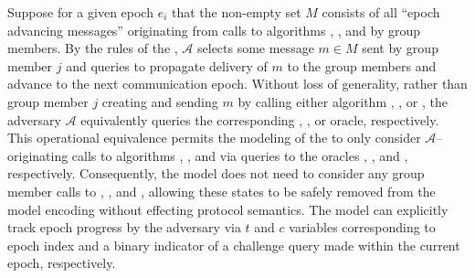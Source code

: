 \documentclass[runningheads]{llncs}
\newcommand{\Adversary}{\ensuremath{\mathcal{A}}\xspace}
\begin{document}
Suppose for a given epoch $e_i$ that the non-empty set $M$ consists of all ``epoch advancing messages'' originating from calls to algorithms , , and  by group members.
By the rules of the \CGKAsec, \Adversary selects some message $m \in M$ sent by group member $j$ and queries  to propagate delivery of $m$ to the group members and advance to the next communication epoch.
Without loss of generality, rather than group member $j$ creating and sending $m$ by calling either algorithm , , or , the adversary \Adversary equivalently queries the corresponding , , or  oracle, respectively.
This operational equivalence permits the modeling of the \CGKAsec to only consider \Adversary--originating calls to algorithms , , and  via queries to the oracles , , and , respectively.
Consequently, the model does not need to consider any group member calls to , , and , allowing these states to be safely removed from the model encoding without effecting protocol semantics.
The model can explicitly track epoch progress by the adversary via $t$ and $c$ variables corresponding to epoch index and a binary indicator of a challenge query made within the current epoch, respectively.
\end{document}
